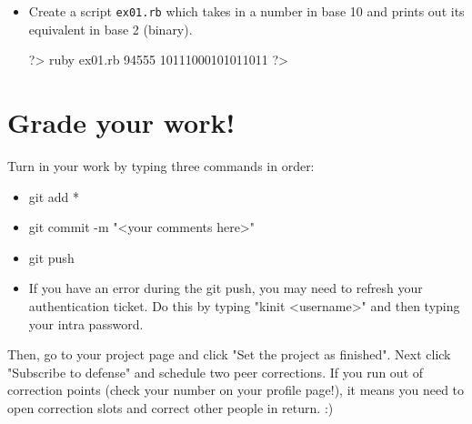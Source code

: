 \documentclass{42-en}
\begin{document}
\begin{itemize}

\item Create a script \texttt{ex01.rb} which takes in a number in base 10 and prints out its equivalent in base 2 (binary).

\begin{42console}
	?> ruby ex01.rb 94555
	10111000101011011
	?>
\end{42console}

\end{itemize}



\chapter{Grade your work!}

Turn in your work by typing three commands in order: 
\begin{itemize}
	\item git add *
	\item git commit -m "<your comments here>"
	\item git push
	\item If you have an error during the git push, you may need to refresh your authentication ticket. Do this by typing "kinit <username>" and then typing your intra password.
\end{itemize}

Then, go to your project page and click "Set the project as finished".
Next click "Subscribe to defense" and schedule two peer corrections.
If you run out of correction points (check your number on your profile page!), it means you need to open correction slots and correct other people in return. :)
\end{document}
